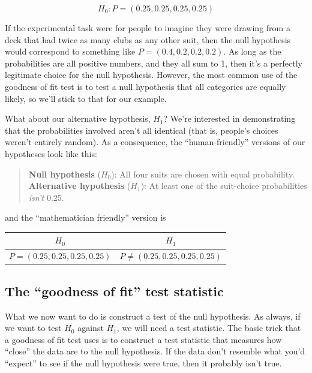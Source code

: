 \documentclass[
]{book}
\theoremstyle{definition}
\theoremstyle{definition}
\theoremstyle{definition}
\theoremstyle{definition}
\theoremstyle{remark}
\begin{document}
\[
H_0: {P} = (0.25, 0.25, 0.25, 0.25)
\]

If the experimental task were for people to imagine they were drawing from a deck that had twice as many clubs as any other suit, then the null hypothesis would correspond to something like \(P = (0.4, 0.2, 0.2, 0.2)\). As long as the probabilities are all positive numbers, and they all sum to 1, then it's a perfectly legitimate choice for the null hypothesis. However, the most common use of the goodness of fit test is to test a null hypothesis that all categories are equally likely, so we'll stick to that for our example.

What about our alternative hypothesis, \(H_1\)? We're interested in demonstrating that the probabilities involved aren't all identical (that is, people's choices weren't entirely random). As a consequence, the ``human-friendly'' versions of our hypotheses look like this:

\begin{quote}
\textbf{Null hypothesis} (\(H_0\)): All four suits are chosen with equal probability.\\
\textbf{Alternative hypothesis} (\(H_1\)): At least one of the suit-choice probabilities \emph{isn't} 0.25.
\end{quote}

and the ``mathematician friendly'' version is

\begin{longtable}[]{@{}cc@{}}
\toprule()
\(H_0\) & \(H_1\) \\
\midrule()
\endhead
\(P = (0.25, 0.25, 0.25, 0.25)\) & \(P \neq (0.25,0.25,0.25,0.25)\) \\
\bottomrule()
\end{longtable}

\hypertarget{the-goodness-of-fit-test-statistic}{%
\subsection{The ``goodness of fit'' test statistic}\label{the-goodness-of-fit-test-statistic}}

What we now want to do is construct a test of the null hypothesis. As always, if we want to test \(H_0\) against \(H_1\), we will need a test statistic. The basic trick that a goodness of fit test uses is to construct a test statistic that measures how ``close'' the data are to the null hypothesis. If the data don't resemble what you'd ``expect'' to see if the null hypothesis were true, then it probably isn't true.
\end{document}

